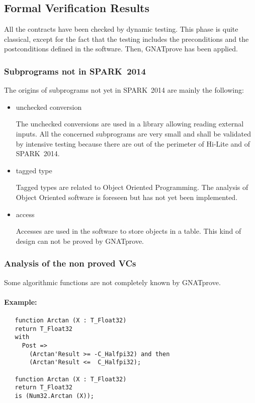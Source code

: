 \documentclass[10pt,a4paper,twocolumn]{article}
\newcommand{\hilite}{Hi-Lite\xspace}
\newcommand{\gnatprove}{GNATprove\xspace}
\newcommand{\newspark}{SPARK~2014\xspace}
\begin{document}
\subsection{Formal Verification Results}

All the contracts have been checked by dynamic testing. This phase is quite classical, except for the fact that the testing includes the preconditions and the postconditions defined in the software. Then, \gnatprove has been applied.

\subsubsection{Subprograms not in \newspark}

The origins of subprograms not yet in \newspark are mainly the following:

\begin{itemize}
\item unchecked conversion

The unchecked conversions are used in a library allowing reading external inputs.
All the concerned subprograms are very small and shall be validated by intensive testing because there are out of the perimeter of \hilite and of \newspark.
\item tagged type

Tagged types are related to Object Oriented Programming. The analysis of Object Oriented software is foreseen but has not yet been implemented.
\item access

Accesses are used in the software to store objects in a table.
This kind of design can not be proved by \gnatprove.
\end{itemize}

\subsubsection{Analysis of the non proved VCs}

Some algorithmic functions are not completely known by \gnatprove.

\paragraph{Example:}

\begin{lstlisting}
   function Arctan (X : T_Float32)
   return T_Float32
   with
     Post =>
       (Arctan'Result >= -C_Halfpi32) and then
       (Arctan'Result <=  C_Halfpi32);

   function Arctan (X : T_Float32)
   return T_Float32
   is (Num32.Arctan (X));
\end{lstlisting}
\end{document}
